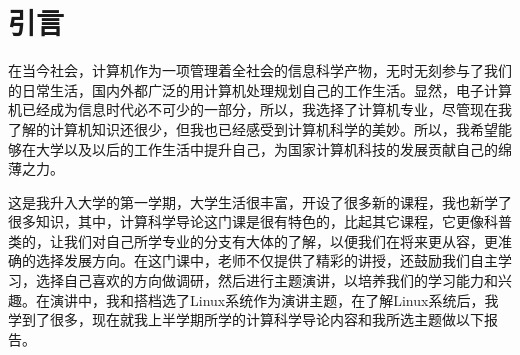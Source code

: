\documentclass{article}
\begin{document}
\thispagestyle{empty}
\newpage
\setcounter{page}{1}
\section{引言}
在当今社会，计算机作为一项管理着全社会的信息科学产物，无时无刻参与了我们的日常生活，国内外都广泛的用计算机处理规划自己的工作生活。显然，电子计算机已经成为信息时代必不可少的一部分，所以，我选择了计算机专业，尽管现在我了解的计算机知识还很少，但我也已经感受到计算机科学的美妙。所以，我希望能够在大学以及以后的工作生活中提升自己，为国家计算机科技的发展贡献自己的绵薄之力。\par
这是我升入大学的第一学期，大学生活很丰富，开设了很多新的课程，我也新学了很多知识，其中，计算科学导论这门课是很有特色的，比起其它课程，它更像科普类的，让我们对自己所学专业的分支有大体的了解，以便我们在将来更从容，更准确的选择发展方向。在这门课中，老师不仅提供了精彩的讲授，还鼓励我们自主学习，选择自己喜欢的方向做调研，然后进行主题演讲，以培养我们的学习能力和兴趣。在演讲中，我和搭档选了Linux系统作为演讲主题，在了解Linux系统后，我学到了很多，现在就我上半学期所学的计算科学导论内容和我所选主题做以下报告。
\end{document}
